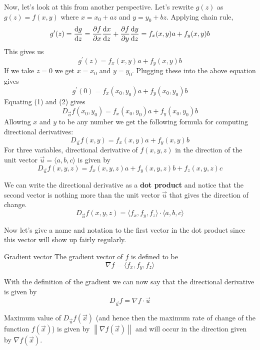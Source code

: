 Now, let's look at this from another perspective. Let's rewrite $g(z)$ as $g(z) = f(x,y)$ where $x=x_0+az$ and $y=y_0+bz$. Applying chain rule,
\[ g^\prime(z) = \odv{g}{z} = \pdv{f}{x}\odv{x}{z} + \pdv{f}{y}\odv{y}{z} = f_x (x,y)a + f_y (x,y)b \]
This gives us
\[ g^\prime(z) = f_x (x,y)a + f_y (x,y)b \]
If we take $z=0$ we get $x=x_0$ and $y=y_0$. Plugging these into the above equation gives
\begin{equation}\tag{2}
g^\prime(0) = f_x (x_0,y_0)a + f_y (x_0,y_0)b
\end{equation}
Equating (1) and (2) gives
\[ {D_{\vec u}}f(x_0,y_0) = f_x(x_0,y_0)a + f_y(x_0,y_0)b \]
Allowing $x$ and $y$ to be any number we get the following formula for computing directional derivatives:
\[ {D_{\vec u}}f(x,y) = f_x(x,y)a + f_y(x,y)b \]
For three variables, directional derivative of $f(x,y,z)$ in the direction of the unit vector $\vec{u}=\langle{a,b,c}\rangle$ is given by
\begin{equation}
{D_{\vec u}}f(x,y,z) = f_x (x,y,z)a + f_y (x,y,z)b + f_z (x,y,z)c
\end{equation}

We can write the directional derivative as a \textbf{dot product} and notice that the second vector is nothing more than the unit vector $\vec u$ that gives the direction of change.
\begin{equation}
{D_{\vec u}} f(x,y,z) = \langle {f_x,f_y,f_z} \rangle \cdot \langle {a,b,c} \rangle
\end{equation}

Now let's give a name and notation to the first vector in the dot product since this vector will show up fairly regularly.
\begin{defn}{Gradient vector}
The gradient vector of $f$ is defined to be
\begin{equation}
\nabla f = \langle f_x,f_y,f_z \rangle
\end{equation}
\end{defn}

With the definition of the gradient we can now say that the directional derivative is given by
\[ {D_{\vec u}}f = \nabla f\cdot \vec u \]

\begin{thrm}{}{}
Maximum value of $D_{\vec u} f(\vec{x})$ (and hence then the maximum rate of change of the function $f(\vec{x})$) is given by $\left\|\nabla f(\vec{x})\right\|$ and will occur in the direction given by $\nabla f(\vec{x})$.
\end{thrm}

